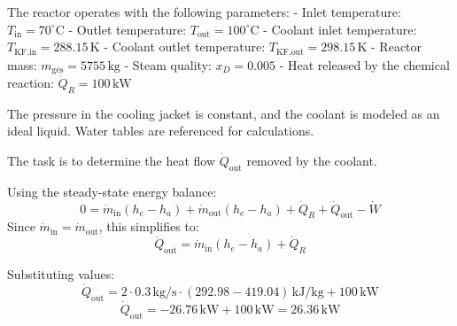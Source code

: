 The reactor operates with the following parameters:  
- Inlet temperature: \( T_{\text{in}} = 70^\circ\text{C} \)  
- Outlet temperature: \( T_{\text{out}} = 100^\circ\text{C} \)  
- Coolant inlet temperature: \( T_{\text{KF,in}} = 288.15 \, \text{K} \)  
- Coolant outlet temperature: \( T_{\text{KF,out}} = 298.15 \, \text{K} \)  
- Reactor mass: \( m_{\text{ges}} = 5755 \, \text{kg} \)  
- Steam quality: \( x_D = 0.005 \)  
- Heat released by the chemical reaction: \( \dot{Q}_R = 100 \, \text{kW} \)  

The pressure in the cooling jacket is constant, and the coolant is modeled as an ideal liquid. Water tables are referenced for calculations.  

The task is to determine the heat flow \( \dot{Q}_{\text{out}} \) removed by the coolant.  

Using the steady-state energy balance:  
\[
0 = \dot{m}_{\text{in}} (h_e - h_a) + \dot{m}_{\text{out}} (h_e - h_a) + \dot{Q}_R + \dot{Q}_{\text{out}} - \dot{W}
\]  
Since \( \dot{m}_{\text{in}} = \dot{m}_{\text{out}} \), this simplifies to:  
\[
\dot{Q}_{\text{out}} = \dot{m}_{\text{in}} (h_e - h_a) + \dot{Q}_R
\]  

Substituting values:  
\[
\dot{Q}_{\text{out}} = 2 \cdot 0.3 \, \text{kg/s} \cdot (292.98 - 419.04) \, \text{kJ/kg} + 100 \, \text{kW}
\]  
\[
\dot{Q}_{\text{out}} = -26.76 \, \text{kW} + 100 \, \text{kW} = 26.36 \, \text{kW}
\]